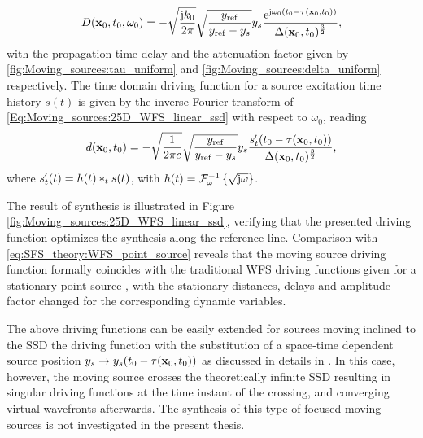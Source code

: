 \begin{equation}
D(\mathbf{x}_0,t_0,\omega_0) = -
\sqrt{\frac{ \mathrm{j} k_0}{2\pi} }
\sqrt{\frac{ y_{\mathrm{ref}} }{y_{\mathrm{ref}}-y_s}}
y_s
\frac{\mathrm{e}^{\mathrm{j} \omega_0\left( t_0 - \tau( \mathbf{x}_0,t_0 )\right)}}{\Delta(\mathbf{x}_0,t_0)^{\frac{3}{2}}},
\label{Eq:Moving_sources:25D_WFS_linear_ssd}
\end{equation}
with the propagation time delay and the attenuation factor given by \eqref{fig:Moving_sources:tau_uniform} and \eqref{fig:Moving_sources:delta_uniform} respectively.
The time domain driving function for a source excitation time history $s(t)$ is given by the inverse Fourier transform of \eqref{Eq:Moving_sources:25D_WFS_linear_ssd} with respect to $\omega_0$, reading 
\begin{equation}
d(\mathbf{x}_0,t_0) = -
\sqrt{\frac{ 1 }{2\pi c} }
\sqrt{\frac{ y_{\mathrm{ref}} }{y_{\mathrm{ref}}-y_s}}
y_s
\frac{s^{\nshortmid}_t(t_0 - \tau( \mathbf{x}_0,t_0 ))}{\Delta(\mathbf{x}_0,t_0)^{\frac{3}{2}}},
\label{Eq:Moving_sources:25D_WFS_linear_ssd_td}
\end{equation}
where $s^{\nshortmid}_t(t) = h(t) \ast_{t} s(t)$, with $h(t) = \mathcal{F}^{-1}_{\omega}\left\{ \sqrt{\mathrm{j} \omega} \right\}$.

The result of synthesis is illustrated in Figure \ref{fig:Moving_sources:25D_WFS_linear_ssd}, verifying that the presented driving function optimizes the synthesis along the reference line.
Comparison with \eqref{eq:SFS_theory:WFS_point_source} reveals that the moving source driving function formally coincides with the traditional WFS driving functions given for a stationary point source \cite[(2.27)]{Verheijen1997:phd}, \cite[(3.16)\&(3.17)]{Start1997:phd} with the stationary distances, delays and amplitude factor changed for the corresponding dynamic variables.

The above driving functions can be easily extended for sources moving inclined to the SSD the driving function with the substitution of a space-time dependent source position $y_s \rightarrow y_s(t_0 - \tau(\mathbf{x}_0,t_0))$ as discussed in details in \cite{firtha2016wave}.
In this case, however, the moving source crosses the theoretically infinite SSD resulting in singular driving functions at the time instant of the crossing, and converging virtual wavefronts afterwards.
The synthesis of this type of focused moving sources is not investigated in the present thesis.


